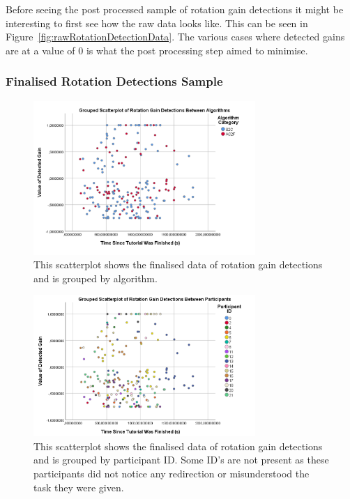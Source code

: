 Before seeing the post processed sample of rotation gain detections it might be interesting to first see how the raw data looks like. This can be seen in Figure~\ref{fig:rawRotationDetectionData}. The various cases where detected gains are at a value of 0 is what the post processing step aimed to minimise. 

\subsubsection{Finalised Rotation Detections Sample}
\begin{figure}[tbph]
    \centering
    \includegraphics[width=0.75\textwidth]{figures/graphs/ProcessedRotationDetections.png}
    \caption[Finalised Detection Scatterplot For Rotation Gains, Grouped by Algorithm]{This scatterplot shows the finalised data of rotation gain detections and is grouped by algorithm.}
    \label{fig:rotationDetectionDataByAlgorithm}
\end{figure}

\begin{figure}[tbph]
    \centering
    \includegraphics[width=0.75\textwidth]{figures/graphs/ProcessedRotationDetectionsByParticipant.png}
    \caption[Finalised Detection Scatterplot For Rotation Gains, Grouped by Participant ID]{This scatterplot shows the finalised data of rotation gain detections and is grouped by participant ID. Some ID's are not present as these participants did not notice any redirection or misunderstood the task they were given.}
    \label{fig:rotationDetectionDataByParticipant}
\end{figure}

